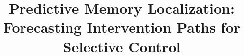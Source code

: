 \documentclass{article}
\title{Predictive Memory Localization: Forecasting Intervention Paths for Selective Control}
\begin{document}
\maketitle

\begin{abstract}

\end{abstract}









\label{pml:main-end}

\clearpage





\end{document}
